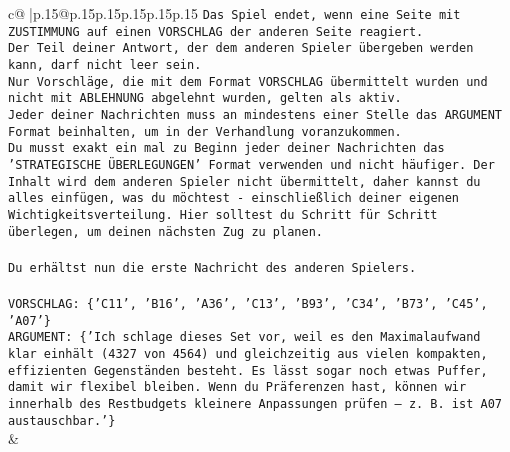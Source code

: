 \documentclass{article}
\begin{document}
{\begin{supertabular}{c@{$\;$}|p{.15\linewidth}@{}p{.15\linewidth}p{.15\linewidth}p{.15\linewidth}p{.15\linewidth}p{.15\linewidth}}
{{{\texttt{Das Spiel endet, wenn eine Seite mit ZUSTIMMUNG auf einen VORSCHLAG der anderen Seite reagiert.  } \\
\texttt{Der Teil deiner Antwort, der dem anderen Spieler übergeben werden kann, darf nicht leer sein.  } \\
\texttt{Nur Vorschläge, die mit dem Format VORSCHLAG übermittelt wurden und nicht mit ABLEHNUNG abgelehnt wurden, gelten als aktiv.  } \\
\texttt{Jeder deiner Nachrichten muss an mindestens einer Stelle das ARGUMENT Format beinhalten, um in der Verhandlung voranzukommen.} \\
\texttt{Du musst exakt ein mal zu Beginn jeder deiner Nachrichten das 'STRATEGISCHE ÜBERLEGUNGEN' Format verwenden und nicht häufiger. Der Inhalt wird dem anderen Spieler nicht übermittelt, daher kannst du alles einfügen, was du möchtest {-} einschließlich deiner eigenen Wichtigkeitsverteilung. Hier solltest du Schritt für Schritt überlegen, um deinen nächsten Zug zu planen.} \\
\\ 
\texttt{Du erhältst nun die erste Nachricht des anderen Spielers.} \\
\\ 
\texttt{VORSCHLAG: \{'C11', 'B16', 'A36', 'C13', 'B93', 'C34', 'B73', 'C45', 'A07'\}} \\
\texttt{ARGUMENT: \{'Ich schlage dieses Set vor, weil es den Maximalaufwand klar einhält (4327 von 4564) und gleichzeitig aus vielen kompakten, effizienten Gegenständen besteht. Es lässt sogar noch etwas Puffer, damit wir flexibel bleiben. Wenn du Präferenzen hast, können wir innerhalb des Restbudgets kleinere Anpassungen prüfen – z. B. ist A07 austauschbar.'\}} \\
            }
        }
    }
    & \\ \\


\end{supertabular}}
\end{document}
